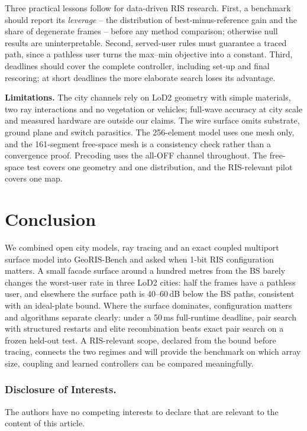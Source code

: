 \documentclass[runningheads]{llncs}
\begin{document}
Three practical lessons follow for data-driven RIS research. First, a benchmark should report its \emph{leverage} -- the distribution of best-minus-reference gain and the share of degenerate frames -- before any method comparison; otherwise null results are uninterpretable. Second, served-user rules must guarantee a traced path, since a pathless user turns the max--min objective into a constant. Third, deadlines should cover the complete controller, including set-up and final rescoring; at short deadlines the more elaborate search loses its advantage.

\textbf{Limitations.} The city channels rely on LoD2 geometry with simple materials, two ray interactions and no vegetation or vehicles; full-wave accuracy at city scale and measured hardware are outside our claims. The wire surface omits substrate, ground plane and switch parasitics. The 256-element model uses one mesh only, and the 161-segment free-space mesh is a consistency check rather than a convergence proof. Precoding uses the all-OFF channel throughout. The free-space test covers one geometry and one distribution, and the RIS-relevant pilot covers one map.

\section{Conclusion}
We combined open city models, ray tracing and an exact coupled multiport surface model into GeoRIS-Bench and asked when 1-bit RIS configuration matters. A small facade surface around a hundred metres from the BS barely changes the worst-user rate in three LoD2 cities: half the frames have a pathless user, and elsewhere the surface path is 40--60\,dB below the BS paths, consistent with an ideal-plate bound. Where the surface dominates, configuration matters and algorithms separate clearly: under a 50\,ms full-runtime deadline, pair search with structured restarts and elite recombination beats exact pair search on a frozen held-out test. A RIS-relevant scope, declared from the bound before tracing, connects the two regimes and will provide the benchmark on which array size, coupling and learned controllers can be compared meaningfully.

\subsubsection*{Disclosure of Interests.} The authors have no competing interests to declare that are relevant to the content of this article.



\end{document}
